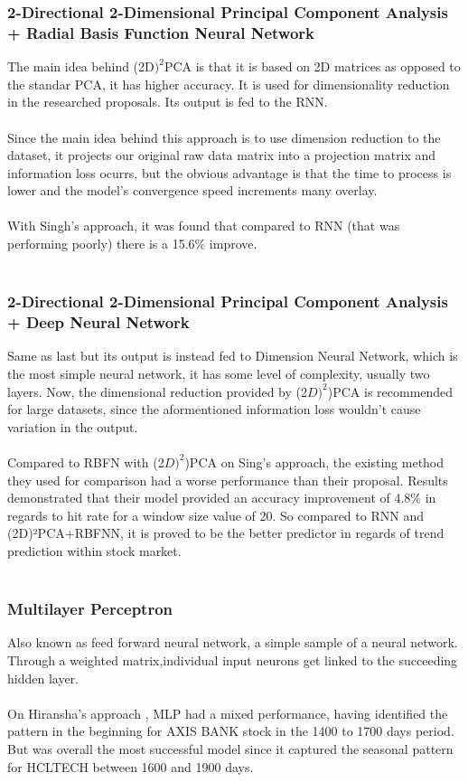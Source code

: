 \documentclass[conference]{IEEEtran}
\begin{document}
\subsubsection{2-Directional 2-Dimensional Principal Component Analysis + Radial Basis Function Neural Network}
The main idea behind (2D$)^2$PCA is that it is based on 2D matrices as opposed to the standar PCA, it has higher accuracy. It is used for dimensionality reduction in
the researched proposals. Its output is fed to the RNN.
\\\\
Since the main idea behind this approach is to use dimension reduction to the dataset, it projects our original raw data matrix into a projection matrix and information loss ocurrs,
but the obvious advantage is that the time to process is lower and the model's convergence speed increments many overlay.
\\\\
With Singh's approach\cite{Singh2016}, it was found that compared to RNN (that was performing poorly) there is a 15.6\% improve. 
\\\\
\subsubsection{2-Directional 2-Dimensional Principal Component Analysis + Deep Neural Network}
Same as last but its output is instead fed to Dimension Neural Network, which is the most simple neural network, it has some level of complexity, usually two layers. Now, the dimensional reduction provided by 
(2$D)^2$)PCA is recommended for large datasets, since the aformentioned information loss wouldn't cause variation in the output.
\\\\
Compared to RBFN with (2$D)^2$)PCA on Sing's approach\cite{Singh2016}, the existing method they used for comparison had a worse performance than their proposal. Results demonstrated that their model provided an accuracy improvement of 4.8\% in regards to hit rate for a window size value of 20. So compared to RNN and (2D)²PCA+RBFNN, it is proved to be the better predictor in regards of trend prediction within stock market.
\\\\
\subsubsection{Multilayer Perceptron}
Also known as feed forward neural network, a simple sample of a neural network. Through a weighted matrix,individual input neurons get linked to the succeeding hidden layer.
\\\\
On Hiransha's approach \cite{M2018}, MLP had a mixed performance, having identified the pattern in the beginning for AXIS BANK stock in the 1400 to 1700 days period. But was overall the most successful model since it captured the seasonal pattern for HCLTECH between 1600 and 1900 days.
\\\\
\end{document}

